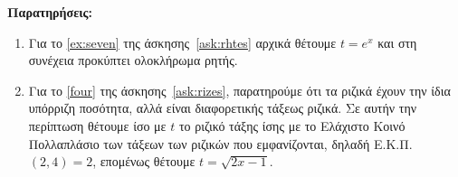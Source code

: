 \documentclass[a4paper,12pt]{article}
\begin{document}
\vspace{\baselineskip}

{\Large\bfseries Παρατηρήσεις:}
\begin{enumerate}
	\item Για το \ref{ex:seven} της άσκησης~\eqref{ask:rhtes} αρχικά θέτουμε $
		t = e^{x} $ και στη συνέχεια προκύπτει ολοκλήρωμα ρητής.
	\item Για το \ref{four} της άσκησης~\eqref{ask:rizes}, παρατηρούμε ότι τα ριζικά έχουν την ίδια
		υπόρριζη ποσότητα, αλλά είναι διαφορετικής τάξεως ριζικά. Σε αυτήν την
		περίπτωση θέτουμε ίσο με $t$ το ριζικό τάξης ίσης με το Ελάχιστο Κοινό
		Πολλαπλάσιο των τάξεων των ριζικών που εμφανίζονται, δηλαδή Ε.Κ.Π. $(2,4)
		= 2 $, επομένως θέτουμε $t=\sqrt{2x-1}$. 
\end{enumerate}
\end{document}
